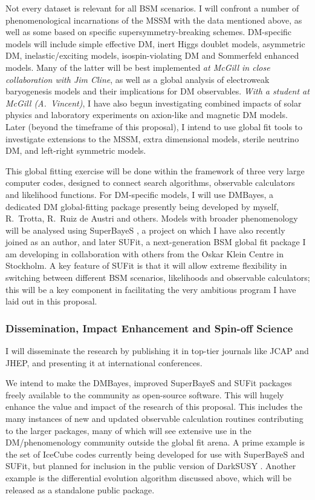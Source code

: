 \documentclass[10pt,oneside,twocolumn,a4paper]{article}
\begin{document}
Not every dataset is relevant for all BSM scenarios.  I will confront a number of phenomenological incarnations of the MSSM with the data mentioned above, as well as some based on specific supersymmetry-breaking schemes.  DM-specific models will include simple effective DM, inert Higgs doublet models, asymmetric DM, inelastic/exciting models, isospin-violating DM and Sommerfeld enhanced models.  Many of the latter will be best implemented \textit{at McGill in close collaboration with Jim Cline}, as well as a global analysis of electroweak baryogenesis models and their implications for DM observables.  \textit{With a student at McGill (A.~Vincent)}, I have also begun investigating combined impacts of solar physics and laboratory experiments on axion-like and magnetic DM models.  Later (beyond the timeframe of this proposal), I intend to use global fit tools to investigate extensions to the MSSM, extra dimensional models, sterile neutrino DM, and left-right symmetric models.

This global fitting exercise will be done within the framework of three very large computer codes, designed to connect search algorithms, observable calculators and likelihood functions.  For DM-specific models, I will use \textsf{DMBayes}, a dedicated DM global-fitting package presently being developed by myself, R.~Trotta, R.~Ruiz de Austri and others.  Models with broader phenomenology will be analysed using \textsf{SuperBayeS} \cite{Ruiz06,Trotta08,SBweb}, a project on which I have also recently joined as an author, and later \textsf{SUFit}, a next-generation BSM global fit package I am developing in collaboration with others from the Oskar Klein Centre in Stockholm.  A key feature of \textsf{SUFit} is that it will allow extreme flexibility in switching between different BSM scenarios, likelihoods and observable calculators; this will be a key component in facilitating the very ambitious program I have laid out in this proposal.

\subsubsection*{Dissemination, Impact Enhancement and Spin-off Science}

I will disseminate the research by publishing it in top-tier journals like JCAP and JHEP, and presenting it at international conferences.

We intend to make the \textsf{DMBayes}, improved \textsf{SuperBayeS} and \textsf{SUFit} packages freely available to the community as open-source software.  This will hugely enhance the value and impact of the research of this proposal.  This includes the many instances of new and updated observable calculation routines contributing to the larger packages, many of which will see extensive use in the DM/phenomenology community outside the global fit arena.  A prime example is the set of IceCube codes currently being developed for use with \textsf{SuperBayeS} and \textsf{SUFit}, but planned for inclusion in the public version of \textsf{DarkSUSY} \cite{darksusy}.  Another example is the differential evolution algorithm discussed above, which will be released as a standalone public package.
\end{document}
